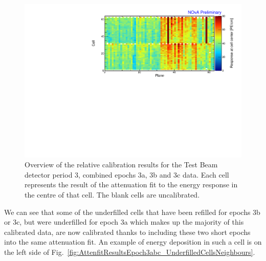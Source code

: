 \begin{figure}[!hbtp]
\centering
\includegraphics[width=\textwidth]{Plots/TBCalibration/CellResponseAtCentre_epoch3abc_Limited_NOvAPlotStyle.pdf}
\caption[Map of fitted response at cell centre for epochs 3a, 3b and 3c data]{Overview of the relative calibration results for the Test Beam detector period 3, combined epochs 3a, 3b and 3c data. Each cell represents the result of the attenuation fit to the energy response in the centre of that cell. The blank cells are uncalibrated.}
\label{fig:CellCentreResponseEp3abc}
\end{figure}

We can see that some of the underfilled cells that have been refilled for epochs 3b or 3c, but were underfilled for epoch 3a which makes up the majority of this calibrated data, are now calibrated thanks to including these two short epochs into the same attenuation fit. An example of energy deposition in such a cell is on the left side of Fig.~\ref{fig:AttenfitResultsEpoch3abc_UnderfilledCellsNeighbours}.

